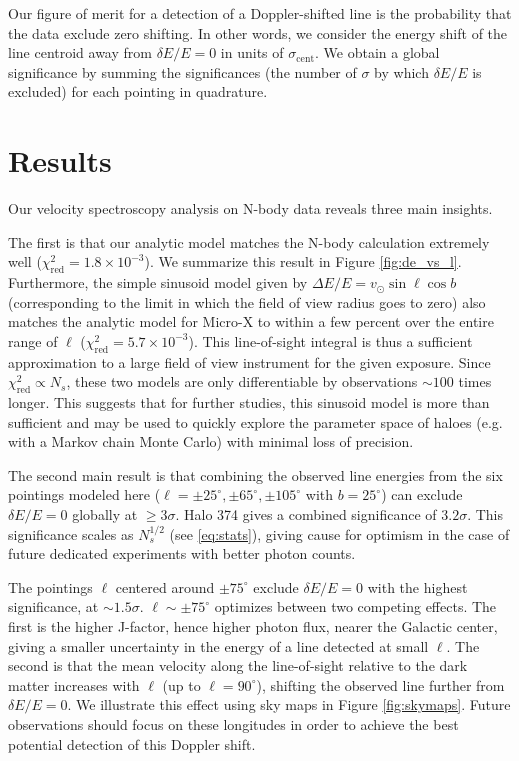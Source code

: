 \documentclass[aps,prd,10pt,twocolumn,superscriptaddress,showpacs]{revtex4-1}
\begin{document}
Our figure of merit for a detection of a Doppler-shifted line is the probability that the data
exclude zero shifting. In other words, we consider the energy shift of the line centroid
away from $\delta E/E=0$ in units of $\sigma_\mathrm{cent}$.
We obtain a global significance by summing the significances (the
number of $\sigma$ by which $\delta E/E$ is excluded) for each
pointing in quadrature.


\section{Results}
\label{sec:results}

Our velocity spectroscopy analysis on N-body data reveals three main insights.

The first is that our analytic model matches the N-body calculation
extremely well ($\chi^2_\mathrm{red}=1.8\times 10^{-3}$).  We summarize this result in Figure
\ref{fig:de_vs_l}. Furthermore, the simple sinusoid model given by $\Delta E/E
= v_\odot \sin \ell \cos b$ (corresponding to the limit in which the field of view radius goes to
zero) also matches the analytic model for Micro-X to within a few percent over the entire range of
$\ell$ ($\chi^2_\mathrm{red}=5.7\times 10^{-3}$). This line-of-sight integral is thus
a sufficient approximation to a large field of view instrument for the given exposure. Since
$\chi^2_\mathrm{red} \propto N_s$, these two models are 
only differentiable by observations $\sim 100$ times longer.  
This suggests that for further studies, this sinusoid model is more than sufficient and may be
used to quickly explore the parameter space of haloes (e.g. with a Markov chain Monte Carlo) with minimal loss of precision.

The second main result is that combining the observed line energies from the six pointings modeled
here ($\ell=\pm25^\circ,\pm65^\circ,\pm105^\circ$ with $b=25^\circ$) can exclude
$\delta E/E = 0$ globally at $\geq 3\sigma$.  Halo 374 gives a combined significance of
$3.2\sigma$. This significance scales as $N_s^{1/2}$ (see \eqref{eq:stats}), giving cause for
optimism in the case of future dedicated experiments with better photon counts.

The pointings $\ell$ centered around $\pm75^\circ$ exclude $\delta E/E=0$ with 
the highest significance, at $\sim 1.5\sigma$. $\ell\sim\pm75^\circ$ optimizes between two
competing effects. The first is the higher J-factor, hence higher
photon flux, nearer the Galactic center, giving a smaller uncertainty in the energy of a line
detected at small $\ell$. The second is that the mean velocity along the line-of-sight relative to
the dark matter increases with $\ell$ (up to $\ell=90^\circ$), shifting the observed line further
from $\delta E/E=0$. We illustrate this effect using sky maps in Figure \ref{fig:skymaps}.
Future observations should focus on these longitudes
in order to achieve the best potential detection of this Doppler shift.
\end{document}
